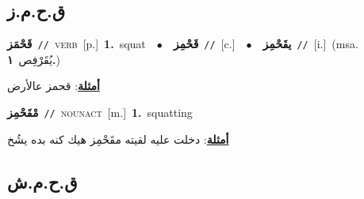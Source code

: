\documentclass[10pt,a4paper,twoside]{article} %
\begin{document}
\begin{multicols}{2}
\vspace{-3mm}
\subsection*{\color{blue}\foreignlanguage{arabic}{ق.ح.م.ز}\color{blue}{}} 

{\setlength\topsep{0pt}\textbf{\foreignlanguage{arabic}{قَحْمَز}}\ {\color{gray}\texttt{//}\color{black}}\ \textsc{verb}\ [p.]\ \textbf{1.}~squat\ \ $\bullet$\ \ \setlength\topsep{0pt}\textbf{\foreignlanguage{arabic}{قَحْمِز}}\ {\color{gray}\texttt{//}\color{black}}\ [c.]\ \ $\bullet$\ \ \setlength\topsep{0pt}\textbf{\foreignlanguage{arabic}{يقَحْمِز}}\ {\color{gray}\texttt{//}\color{black}}\ [i.]\ \color{gray}(msa. \foreignlanguage{arabic}{يُقَرْفِص}~\foreignlanguage{arabic}{\textbf{١.}})\color{black}\  \begin{flushright}\color{gray}\foreignlanguage{arabic}{\textbf{\underline{\foreignlanguage{arabic}{أمثلة}}}: قحمز عالأرض}\end{flushright}\color{black}} \vspace{2mm}

{\setlength\topsep{0pt}\textbf{\foreignlanguage{arabic}{مْقَحْمِز}}\ {\color{gray}\texttt{//}\color{black}}\ \textsc{noun\textunderscore act}\ [m.]\ \textbf{1.}~squatting\  \begin{flushright}\color{gray}\foreignlanguage{arabic}{\textbf{\underline{\foreignlanguage{arabic}{أمثلة}}}: دخلت عليه لقيته مقَحْمِز هيك كنه بده يشُخ}\end{flushright}\color{black}} \vspace{2mm}

\vspace{-3mm}
\subsection*{\color{blue}\foreignlanguage{arabic}{ق.ح.م.ش}\color{blue}{}} 


\end{multicols}
\end{document}
